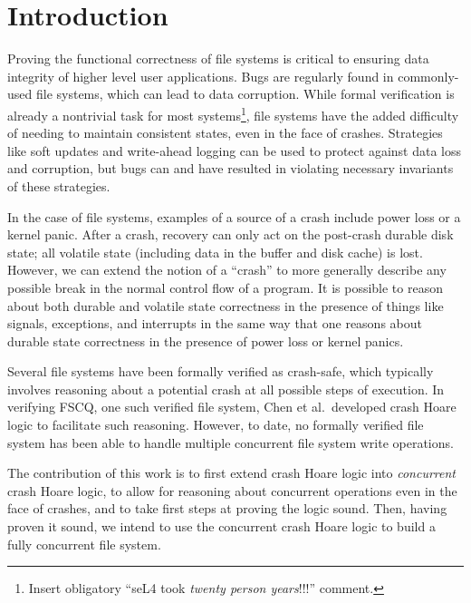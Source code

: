\begin{abstract}
{\it
{}
}
\end{abstract}

\section{Introduction}
Proving the functional correctness of file systems is critical to ensuring data
integrity of higher level user applications. Bugs are regularly found in
commonly-used file systems, which can lead to data
corruption.\cite{yang2006explode} While formal verification is already a
nontrivial task for most systems\footnote{Insert obligatory ``seL4 took
\textit{twenty person years}!!!'' comment.}, file systems have the added
difficulty of needing to maintain consistent states, even in the face of
crashes. Strategies like soft updates and write-ahead logging can be used to
protect against data loss and corruption, but bugs can and have resulted in
violating necessary invariants of these strategies.

In the case of file systems, examples of a source of a crash include power loss
or a kernel panic. After a crash, recovery can only act on the post-crash
durable disk state; all volatile state (including data in the buffer and disk
cache) is lost. However, we can extend the notion of a ``crash'' to more
generally describe any possible break in the normal control flow of a program.
It is possible to reason about both durable and volatile state correctness in
the presence of things like signals, exceptions, and interrupts in the same way
that one reasons about durable state correctness in the presence of power loss
or kernel panics.

Several file systems have been formally verified as crash-safe, which typically
involves reasoning about a potential crash at all possible steps of execution.
In verifying FSCQ, one such verified file system, Chen et al.\ developed crash
Hoare logic to facilitate such reasoning\cite{chen2015using}. However, to date,
no formally verified file system has been able to handle multiple concurrent
file system write operations.

The contribution of this work is to first extend crash Hoare logic into
\textit{concurrent} crash Hoare logic, to allow for reasoning about concurrent
operations even in the face of crashes, and to take first steps at proving the
logic sound. Then, having proven it sound, we intend to use the concurrent
crash Hoare logic to build a fully concurrent file system.

